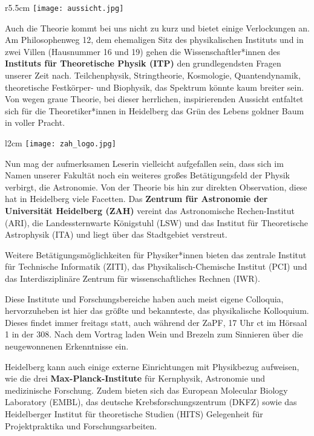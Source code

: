 \begin{wrapfigure}{r}{5.5cm}
\texttt{[image: aussicht.jpg]}
\end{wrapfigure}

Auch die Theorie kommt bei uns nicht zu kurz und bietet einige Verlockungen an. Am Philosophenweg 12, dem ehemaligen Sitz des physikalischen Instituts und in zwei Villen (Hausnummer 16 und 19) gehen die Wissenschaftler*innen des \textbf{Instituts für Theoretische Physik (ITP)} den grundlegendsten Fragen unserer Zeit nach. Teilchenphysik, Stringtheorie, Kosmologie, Quantendynamik, theoretische Festkörper- und Biophysik, das Spektrum könnte kaum breiter sein. Von wegen graue Theorie, bei dieser herrlichen, inspirierenden Aussicht entfaltet sich für die Theoretiker*innen in Heidelberg das Grün des Lebens goldner Baum in voller Pracht.
\begin{wrapfigure}{l}{2cm}
\texttt{[image: zah\_logo.jpg]}
\end{wrapfigure}

Nun mag der aufmerksamen Leserin vielleicht aufgefallen sein, dass sich im Namen unserer Fakultät noch ein weiteres großes Betätigungsfeld der Physik verbirgt, die Astronomie. Von der Theorie bis hin zur direkten Observation, diese hat in Heidelberg viele Facetten.
Das \textbf{Zentrum für Astronomie der Universität Heidelberg (ZAH)} vereint das
Astronomische Rechen-Institut (ARI), die Landessternwarte Königstuhl (LSW) und das Institut für Theoretische Astrophysik (ITA) und liegt über das Stadtgebiet verstreut. 

Weitere Betätigungsmöglichkeiten für Physiker*innen bieten das zentrale Institut für Technische Informatik (ZITI), das Physikalisch-Chemische Institut (PCI) und das Interdisziplinäre Zentrum für wissenschaftliches Rechnen (IWR).

Diese Institute und Forschungsbereiche haben auch meist eigene Colloquia, hervorzuheben ist hier das größte und bekannteste, das physikalische Kolloquium. Dieses findet immer freitags statt, auch während der ZaPF, 17 Uhr ct im Hörsaal 1 in der 308. Nach dem Vortrag laden Wein und Brezeln zum Sinnieren über die neugewonnenen Erkenntnisse ein.

Heidelberg kann auch einige externe Einrichtungen mit Physikbezug aufweisen, wie die drei \textbf{Max-Planck-Institute} für Kernphysik, Astronomie und medizinische Forschung. Zudem bieten sich das European Molecular Biology Laboratory (EMBL), das deutsche Krebsforschungszentrum (DKFZ) sowie das Heidelberger Institut für theoretische Studien (HITS) Gelegenheit für Projektpraktika und Forschungsarbeiten.

